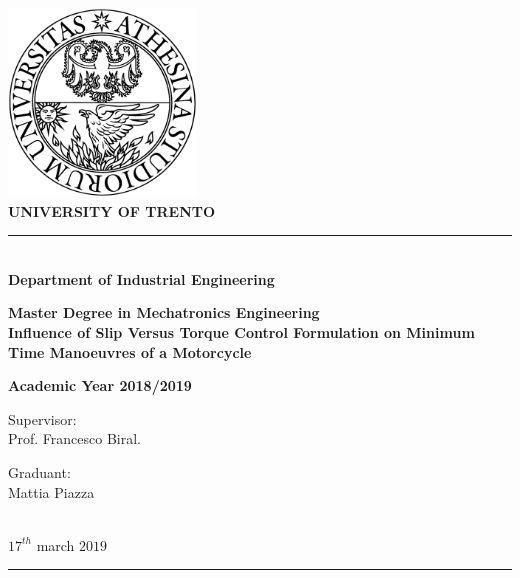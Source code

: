 \begin{titlepage}
\begin{center}
\includegraphics[width=5cm]{img/logo.png}\\[1cm]
{\LARGE \bfseries UNIVERSITY OF TRENTO \\[1cm]}


\rule{\linewidth}{0.3mm} \\[1cm]

{\LARGE \bfseries Department of Industrial Engineering\\[1cm]}

{ \Large \bfseries  Master Degree in Mechatronics Engineering\\[1.5cm] }
%
{ \Large \bfseries  Influence of Slip Versus Torque Control Formulation on Minimum Time Manoeuvres of a Motorcycle \\[1cm] }

{ \large \bfseries  Academic Year 2018/2019 \\[3cm] }

\end{center}


\begin{minipage}{0.5\linewidth}
Supervisor:\\
Prof. Francesco Biral.
\end{minipage}%
\begin{minipage}{0.5\linewidth}
\begin{flushright}
    Graduant:\\
    Mattia Piazza  
\end{flushright}
\end{minipage}
\\[0.5cm]


\vfill
$17^{th}$ march $2019$ \\
\rule{\linewidth}{0.3mm} \\[0.5cm]
\end{titlepage}
%


